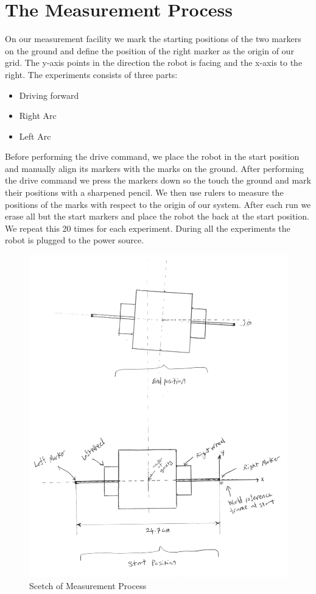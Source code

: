\documentclass[paper=a4, fontsize=11pt]{scrartcl} %
\numberwithin{equation}{section} %
\numberwithin{figure}{section} %
\numberwithin{table}{section} %
\begin{document}
\section{The Measurement Process}
On our measurement facility we mark the starting positions of the two markers on the ground and define the position of the right marker as the origin of our grid. 
The y-axis points in the direction the robot is facing and the x-axis to the right.
The experiments consists of three parts:
\begin{itemize}
	\item Driving forward
	\item Right Arc
	\item Left Arc
\end{itemize}
Before performing the drive command, we place the robot in the start position and manually align its markers with the marks on the ground.
After performing the drive command we press the markers down so the touch the ground and mark their positions with a sharpened pencil.
We then use rulers to measure the positions of the marks with respect to the origin of our system.
After each run we erase all but the start markers and place the robot the back at the start position.
We repeat this 20 times for each experiment.
During all the experiments the robot is plugged to the power source.

\begin{figure}[h]
 
\includegraphics[width=0.9\linewidth]{experimental_setup.png} 
\caption{Scetch of Measurement Process}
\label{fig:setup}
\end{figure}
\end{document}
